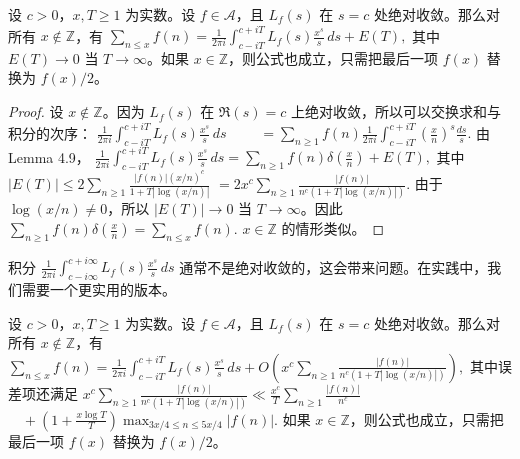 \begin{theorem}
	设 $c>0$，$x,T\geq 1$ 为实数。设 $f\in\mathcal A$，且 $L_f(s)$ 在 $s=c$ 处绝对收敛。那么对所有 $x\notin\mathbb Z$，有
	\(\textstyle \sum_{n\leq\allowbreak{} x}f(n) =\allowbreak{} \frac1{2\pi i}\int_{c-iT}^{c+\allowbreak{}iT} L_f(s)\frac{x^s}{s}\,ds +\allowbreak{} E(T),\allowbreak{}\)
	其中 $E(T)\to 0$ 当 $T\to\infty$。如果 $x\in\mathbb Z$，则公式也成立，只需把最后一项 $f(x)$ 替换为 $f(x)/2$。
\end{theorem}

\begin{proof}
	设 $x\notin\mathbb Z$。因为 $L_f(s)$ 在 $\Re(s)=c$ 上绝对收敛，所以可以交换求和与积分的次序：
	\(\textstyle \frac1{2\pi i}\int_{c-iT}^{c+\allowbreak{}iT} L_f(s)\frac{x^s}{s}\,ds\) \(\textstyle \qquad=\allowbreak{} \sum_{n\geq\allowbreak{} 1}f(n) \frac1{2\pi i} \int_{c-iT}^{c+\allowbreak{}iT}\left(\frac{x}{n}\right)^s\frac{ds}{s}.\)
	由 Lemma 4.9，
	\(\textstyle \frac1{2\pi i}\int_{c-iT}^{c+\allowbreak{}iT} L_f(s)\frac{x^s}{s}\,ds =\allowbreak{} \sum_{n\geq\allowbreak{} 1}f(n)\delta\left(\frac{x}{n}\right) +\allowbreak{} E(T),\allowbreak{}\)
	其中
	\(\textstyle |E(T)| \leq\allowbreak{} 2\sum_{n\geq\allowbreak{} 1} \frac{|f(n)|(x/n)^c} {1+\allowbreak{}T|\log(x/n)|}\) \(\textstyle =\allowbreak{} 2x^c\sum_{n\geq\allowbreak{} 1} \frac{|f(n)|}{n^c(1+\allowbreak{}T|\log(x/n)|)}.\)
	由于 $\log(x/n)\neq 0$，所以 $|E(T)|\to 0$ 当 $T\to\infty$。因此
	\(\textstyle \sum_{n\geq\allowbreak{} 1}f(n)\delta\left(\frac{x}{n}\right) =\allowbreak{} \sum_{n\leq\allowbreak{} x}f(n).\)
	$x\in\mathbb Z$ 的情形类似。
\end{proof}

\begin{remark}
	积分
	\(\textstyle \frac1{2\pi i}\int_{c-i\infty}^{c+\allowbreak{}i\infty} L_f(s)\frac{x^s}{s}\,ds\)
	通常不是绝对收敛的，这会带来问题。在实践中，我们需要一个更实用的版本。
\end{remark}

\begin{theorem}
	设 $c>0$，$x,T\geq 1$ 为实数。设 $f\in\mathcal A$，且 $L_f(s)$ 在 $s=c$ 处绝对收敛。那么对所有 $x\notin\mathbb Z$，有
	\(\textstyle \sum_{n\leq\allowbreak{} x}f(n) =\allowbreak{} \frac1{2\pi i}\int_{c-iT}^{c+\allowbreak{}iT} L_f(s)\frac{x^s}{s}\,ds +\allowbreak{} O\left( x^c\sum_{n\geq\allowbreak{} 1} \frac{|f(n)|}{n^c(1+\allowbreak{}T|\log(x/n)|)} \right),\allowbreak{}\)
	其中误差项还满足
	\(\textstyle x^c\sum_{n\geq\allowbreak{} 1} \frac{|f(n)|}{n^c(1+\allowbreak{}T|\log(x/n)|)} \ll\allowbreak{} \frac{x^c}{T}\sum_{n\geq\allowbreak{} 1}\frac{|f(n)|}{n^c}\) \(\textstyle \quad+\allowbreak{} \left(1+\allowbreak{}\frac{x\log T}{T}\right) \max_{3x/4\leq\allowbreak{} n\leq\allowbreak{} 5x/4}|f(n)|.\)
	如果 $x\in\mathbb Z$，则公式也成立，只需把最后一项 $f(x)$ 替换为 $f(x)/2$。
\end{theorem}

